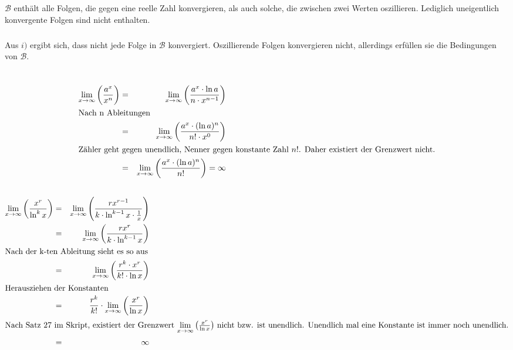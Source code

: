 \documentclass[10pt,a4paper,oneside,ngerman,numbers=noenddot]{scrartcl}
\begin{document}
\subsection{} %
\setcounter{subsubsection}{0}
\subsubsection{} %
$\mathcal{B}$ enthält alle Folgen, die gegen eine reelle Zahl konvergieren, als auch solche, die zwischen zwei Werten oszillieren.
Lediglich uneigentlich konvergente Folgen sind nicht enthalten.
\subsubsection{} %
Aus $i)$ ergibt sich, dass nicht jede Folge in $\mathcal{B}$ konvergiert. Oszillierende Folgen konvergieren nicht, allerdings erfüllen sie die Bedingungen von $\mathcal{B}$.
\section{} %
\subsection{} %
\begin{alignat*}{2}
\lim\limits_{x \rightarrow \infty} \left(\frac{a^{x}}{x^{n}}\right) &=& \lim\limits_{x \rightarrow \infty} \left(\frac{a^{x} \cdot \ln a}{n \cdot x^{n-1}}\right) \\
\intertext{Nach n Ableitungen}
&=& \lim\limits_{x \rightarrow \infty} \left(\frac{a^{x} \cdot (\ln a)^{n}}{n! \cdot x^{0}}\right) \\
\intertext{Zähler geht gegen unendlich, Nenner gegen konstante Zahl $n!$. Daher existiert der Grenzwert nicht.}
&=& \lim\limits_{x \rightarrow \infty} \left(\frac{a^{x} \cdot (\ln a)^{n}}{n!}\right) = \infty
\end{alignat*}
\subsection{} %
\begin{alignat*}{2}
\lim\limits_{x \rightarrow \infty} \left(\frac{x^{r}}{\ln^{k} x} \right) &=& \lim\limits_{x \rightarrow \infty} \left(\frac{rx^{r-1}}{k \cdot \ln^{k-1} x \cdot \frac{1}{x}} \right) \\
&=& \lim\limits_{x \rightarrow \infty} \left(\frac{rx^{r}}{k \cdot \ln^{k-1} x} \right) \\
\intertext{Nach der k-ten Ableitung sieht es so aus}
&=& \lim\limits_{x \rightarrow \infty} \left(\frac{r^{k} \cdot x^{r}}{k! \cdot \ln x} \right) \\
\intertext{Herausziehen der Konstanten}
&=& \frac{r^{k}}{k!} \cdot \lim\limits_{x \rightarrow \infty} \left(\frac{x^{r}}{\ln x} \right) \\
\intertext{Nach Satz 27 im Skript, existiert der Grenzwert $\lim\limits_{x \rightarrow \infty} \left(\frac{x^{r}}{\ln x} \right)$ nicht bzw. ist unendlich. Unendlich mal eine Konstante ist immer noch unendlich.}
&=& \infty
\end{alignat*}
\end{document}
